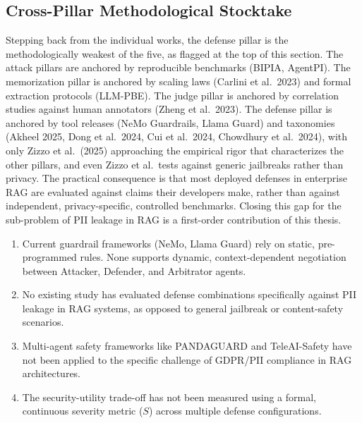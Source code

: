\documentclass[12pt,a4paper]{report}
\begin{document}
\subsection{Cross-Pillar Methodological Stocktake}
\label{subsec:pillar-stocktake}

Stepping back from the individual works, the defense pillar is the methodologically weakest of the five, as flagged at the top of this section. The attack pillars are anchored by reproducible benchmarks (BIPIA, AgentPI). The memorization pillar is anchored by scaling laws (Carlini et al.\ 2023) and formal extraction protocols (LLM-PBE). The judge pillar is anchored by correlation studies against human annotators (Zheng et al.\ 2023). The defense pillar is anchored by tool releases (NeMo Guardrails, Llama Guard) and taxonomies (Akheel 2025, Dong et al.\ 2024, Cui et al.\ 2024, Chowdhury et al.\ 2024), with only Zizzo et al.\ (2025) approaching the empirical rigor that characterizes the other pillars, and even Zizzo et al.\ tests against generic jailbreaks rather than privacy. The practical consequence is that most deployed defenses in enterprise RAG are evaluated against claims their developers make, rather than against independent, privacy-specific, controlled benchmarks. Closing this gap for the sub-problem of PII leakage in RAG is a first-order contribution of this thesis.

\begin{gapbox}
\begin{enumerate}[leftmargin=1.5em, itemsep=3pt]
  \item Current guardrail frameworks (NeMo, Llama Guard) rely on static, pre-programmed rules. None supports dynamic, context-dependent negotiation between Attacker, Defender, and Arbitrator agents.
  \item No existing study has evaluated defense combinations specifically against PII leakage in RAG systems, as opposed to general jailbreak or content-safety scenarios.
  \item Multi-agent safety frameworks like PANDAGUARD and TeleAI-Safety have not been applied to the specific challenge of GDPR/PII compliance in RAG architectures.
  \item The security-utility trade-off has not been measured using a formal, continuous severity metric ($S$) across multiple defense configurations.
\end{enumerate}
\end{gapbox}


\end{document}
